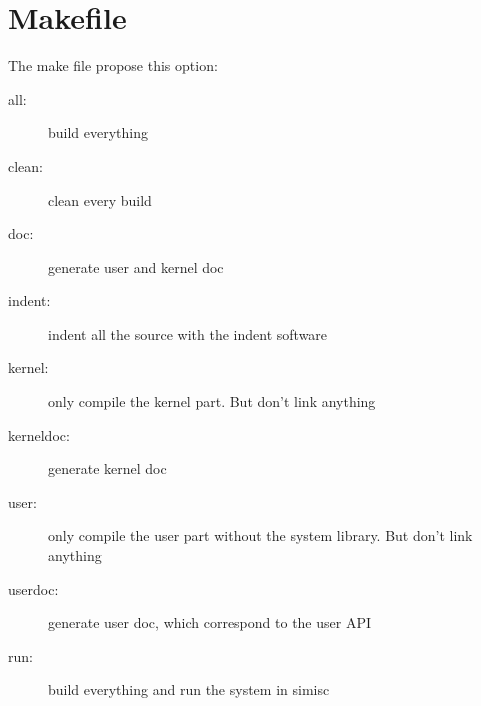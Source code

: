 \section{Makefile}

The make file propose this option:
\begin{description}
  \item[all:] build everything
  \item[clean:] clean every build
  \item[doc:] generate user and kernel doc
  \item[indent:] indent all the source with the indent software
  \item[kernel:] only compile the kernel part. But don't link anything
  \item[kerneldoc:] generate kernel doc
  \item[user:] only compile the user part without the system library. But don't link anything
  \item[userdoc:] generate user doc, which correspond to the user API
  \item[run:] build everything and run the system in simisc
\end{description}

